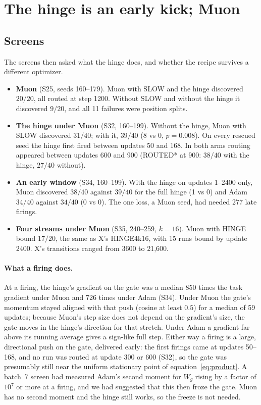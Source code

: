 \documentclass[11pt]{article}
\newcommand{\arm}[1]{\textsf{#1}}
\begin{document}
\section{The hinge is an early kick; Muon}
\label{sec:kick}

\subsection{Screens}

The screens then asked what the hinge does, and whether the recipe survives a different optimizer.
\begin{itemize}
\item \textbf{Muon} (S25, seeds 160--179). Muon with SLOW and the hinge discovered $20/20$, all routed at step 1200. Without SLOW and without the hinge it discovered $9/20$, and all 11 failures were position splits.
\item \textbf{The hinge under Muon} (S32, 160--199). Without the hinge, Muon with SLOW discovered $31/40$; with it, $39/40$ (8 vs 0, $p = 0.008$). On every rescued seed the hinge first fired between updates 50 and 168. In both arms routing appeared between updates 600 and 900 (ROUTED* at 900: $38/40$ with the hinge, $27/40$ without).
\item \textbf{An early window} (S34, 160--199). With the hinge on updates 1--2400 only, Muon discovered $38/40$ against $39/40$ for the full hinge (1 vs 0) and Adam $34/40$ against $34/40$ (0 vs 0). The one loss, a Muon seed, had needed 277 late firings.
\item \textbf{Four streams under Muon} (S35, 240--259, $k = 16$). Muon with HINGE bound $17/20$, the same as X's \arm{HINGE4k16}, with 15 runs bound by update 2400. X's transitions ranged from 3600 to 21{,}600.
\end{itemize}

\paragraph{What a firing does.} At a firing, the hinge's gradient on the gate was a median 850 times the task gradient under Muon and 726 times under Adam (S34). Under Muon the gate's momentum stayed aligned with that push (cosine at least $0.5$) for a median of 59 updates; because Muon's step size does not depend on the gradient's size, the gate moves in the hinge's direction for that stretch. Under Adam a gradient far above its running average gives a sign-like full step. Either way a firing is a large, directional push on the gate, delivered early: the first firings came at updates 50--168, and no run was routed at update 300 or 600 (S32), so the gate was presumably still near the uniform stationary point of equation~\eqref{eq:product}. A batch~7 screen had measured Adam's second moment for $W_g$ rising by a factor of $10^7$ or more at a firing, and we had suggested that this then froze the gate. Muon has no second moment and the hinge still works, so the freeze is not needed.
\end{document}
